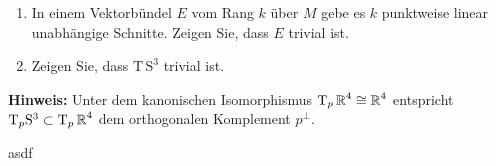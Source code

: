 \begin{Aufg}\begin{enumerate}[label=\alph*),leftmargin=*,widest=b]
\item
	In einem Vektorbündel $E$ vom Rang $k$ über $M$ gebe es $k$ punktweise linear unabhängige Schnitte. Zeigen Sie, dass $E$ trivial ist.
\item
	Zeigen Sie, dass $\mathrm{T}\,\mathrm{S}^3$ trivial ist.
\end{enumerate}
{\footnotesize \textbf{Hinweis:} Unter dem kanonischen Isomorphismus $\mathrm{T}_p \operatorname{\mathbb{R}}^4 \cong \operatorname{\mathbb{R}}^4$ entspricht $\mathrm{T}_p\mathrm{S}^3 \subset \mathrm{T}_p\operatorname{\mathbb{R}}^4$ dem orthogonalen Komplement $p^{\perp}$.}
\end{Aufg}

\begin{Loes}
asdf
\end{Loes}

